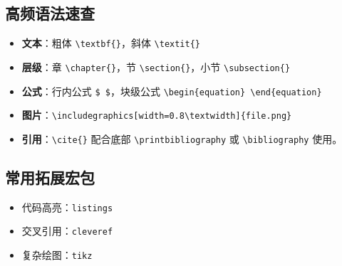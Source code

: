 \subsection{高频语法速查}
\begin{itemize}
    \item \textbf{文本}：粗体 \texttt{\textbackslash textbf\{\}}，斜体 \texttt{\textbackslash textit\{\}}
    \item \textbf{层级}：章 \texttt{\textbackslash chapter\{\}}，节 \texttt{\textbackslash section\{\}}，小节 \texttt{\textbackslash subsection\{\}}
    \item \textbf{公式}：行内公式 \texttt{\$ \$}，块级公式 \texttt{\textbackslash begin\{equation\} \textbackslash end\{equation\}}
    \item \textbf{图片}：\texttt{\textbackslash includegraphics[width=0.8\textbackslash textwidth]\{file.png\}}
    \item \textbf{引用}：\texttt{\textbackslash cite\{\}} 配合底部 \texttt{\textbackslash printbibliography} 或 \texttt{\textbackslash bibliography} 使用。
\end{itemize}

\subsection{常用拓展宏包}
\begin{itemize}
    \item 代码高亮：\texttt{listings}
    \item 交叉引用：\texttt{cleveref}
    \item 复杂绘图：\texttt{tikz}
\end{itemize}
